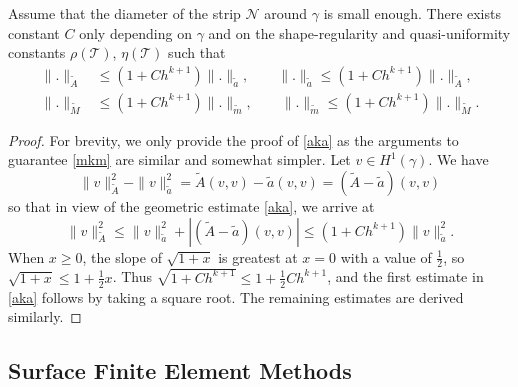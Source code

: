 \documentclass{siamart0516}
\numberwithin{equation}{section}
\numberwithin{theorem}{section}
\numberwithin{figure}{section}
\begin{document}
\begin{corollary}
	Assume that the diameter of the strip $\mathcal N$ around $\gamma$ is small enough. There exists constant $C$ only depending on $\gamma$ and on the shape-regularity and quasi-uniformity constants $\rho(\mathcal T)$, $\eta(\mathcal T)$ such that 
	\begin{align}
	\|.\|_{\widetilde A}  &\leq (1+C h^{k+1})\|.\|_{\tilde a}, \qquad  \|.\|_{\tilde a}\leq (1+Ch^{k+1}) \| .\|_{\widetilde A},
	\label{aka}
\\
	\|.\|_{\widetilde M}  &\leq (1+C h^{k+1})\|.\|_{\tilde m}, \qquad \|.\|_{\tilde m} \leq (1+Ch^{k+1})\|.\|_{\widetilde M}.
	\label{mkm}
	\end{align}
\end{corollary}
\begin{proof}
    For brevity, we only provide the proof of \eqref{aka} as the arguments to guarantee \eqref{mkm} are similar and somewhat simpler. 
    Let $v \in H^1(\gamma)$. We have
	\begin{equation}\label{e:Aa}
	\|v\|^2_{\widetilde A} -  \|v\|_{\tilde a}^2 = \widetilde A (v,v) - \tilde a(v,v) = (\widetilde A-\tilde a)(v,v) 
	\end{equation}
	so that in view of the geometric estimate \eqref{aka}, we arrive at
	$$
	\|v\|^2_{\widetilde A} \leq \|v\|_{\tilde a}^2 + |(\widetilde A-\tilde a)(v,v)| \leq (1 + Ch^{k+1})\|v\|^2_{\tilde a}.
	$$
	When $x \ge 0$, the slope of $\sqrt{1+x}$ is greatest at $x=0$ with a value of $\frac{1}{2}$, so $\sqrt{1+x} \leq 1+ \frac{1}{2}x$.  Thus $\sqrt{1+Ch^{k+1}}\leq 1+\frac{1}{2}Ch^{k+1}$, and the first estimate in \eqref{aka} follows by taking a square root.  The remaining estimates are derived similarly.	
	\end{proof}






\subsection{Surface Finite Element Methods}
\label{sec:sfem}
\end{document}
